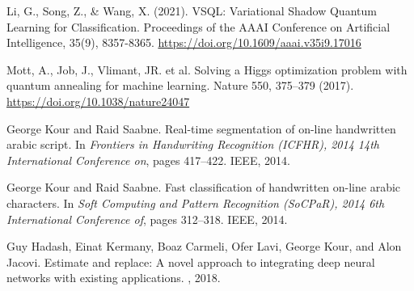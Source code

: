\documentclass{article}
\begin{document}
  


\begin{thebibliography}{1}


Li, G., Song, Z., \& Wang, X. (2021). 
VSQL: Variational Shadow Quantum Learning for Classification. 
Proceedings of the AAAI Conference on Artificial Intelligence, 35(9), 8357-8365. \url{https://doi.org/10.1609/aaai.v35i9.17016}

Mott, A., Job, J., Vlimant, JR. et al. Solving a Higgs optimization problem with 
quantum annealing for machine learning. Nature 550, 375–379 (2017). \url{https://doi.org/10.1038/nature24047}

George Kour and Raid Saabne.
\newblock Real-time segmentation of on-line handwritten arabic script.
\newblock In {\em Frontiers in Handwriting Recognition (ICFHR), 2014 14th
  International Conference on}, pages 417--422. IEEE, 2014.

George Kour and Raid Saabne.
\newblock Fast classification of handwritten on-line arabic characters.
\newblock In {\em Soft Computing and Pattern Recognition (SoCPaR), 2014 6th
  International Conference of}, pages 312--318. IEEE, 2014.

Guy Hadash, Einat Kermany, Boaz Carmeli, Ofer Lavi, George Kour, and Alon
  Jacovi.
\newblock Estimate and replace: A novel approach to integrating deep neural
  networks with existing applications.
, 2018.

\end{thebibliography}
\end{document}

